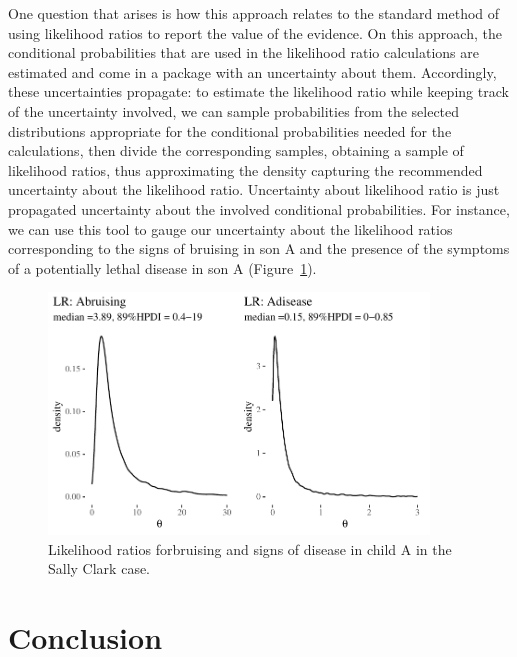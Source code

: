 \documentclass[
  letterpaper,
  DIV=11,
  numbers=noendperiod]{scrartcl}
\begin{document}
One question that arises is how this approach relates to the standard
method of using likelihood ratios to report the value of the evidence.
On this approach, the conditional probabilities that are used in the
likelihood ratio calculations are estimated and come in a package with
an uncertainty about them. Accordingly, these uncertainties propagate:
to estimate the likelihood ratio while keeping track of the uncertainty
involved, we can sample probabilities from the selected distributions
appropriate for the conditional probabilities needed for the
calculations, then divide the corresponding samples, obtaining a sample
of likelihood ratios, thus approximating the density capturing the
recommended uncertainty about the likelihood ratio. Uncertainty about
likelihood ratio is just propagated uncertainty about the involved
conditional probabilities. For instance, we can use this tool to gauge
our uncertainty about the likelihood ratios corresponding to the signs
of bruising in son A and the presence of the symptoms of a potentially
lethal disease in son A (Figure~\ref{fig-sclrs}).

\begin{figure}[H]

{\centering \includegraphics[width=0.9\textwidth,height=\textheight]{imp_philosophical_files/figure-pdf/fig-sclrs-1.pdf}

}

\caption{\label{fig-sclrs}Likelihood ratios forbruising and signs of
disease in child A in the Sally Clark case.}

\end{figure}

\hypertarget{conclusion}{%
\section{Conclusion}\label{conclusion}}
\end{document}
